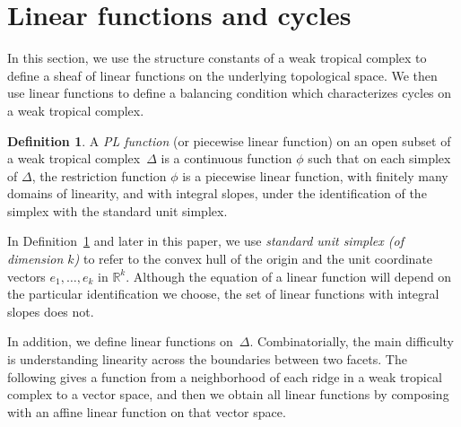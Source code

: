 \documentclass[11pt,reqno]{amsart}
\theoremstyle{definition}
\newtheorem{defn}[thm]{Definition}
\newcommand{\defi}[1]{\emph{#1}}
\newcommand{\RR}{\mathbb R}
\begin{document}
\section{Linear functions and cycles}\label{s:linear}

In this section, we use the structure constants of a weak tropical complex to
define a sheaf of linear functions on the underlying topological space. We then
use linear functions to define a balancing condition which characterizes
cycles on a weak tropical complex.

\begin{defn}\label{d:pl-function}
A \defi{PL function} (or piecewise linear function) on an open subset of a weak
tropical complex~$\Delta$ is a continuous function $\phi$ such that on each
simplex of $\Delta$, the restriction function $\phi$ is a piecewise linear
function, with finitely many domains of linearity, and with integral slopes,
under the
identification of the simplex with the standard unit simplex.
\end{defn}

In Definition~\ref{d:pl-function} and later in this paper, we use \defi{standard
unit simplex (of dimension $k$)} to refer to the convex hull of the origin and
the unit coordinate vectors $e_1, \ldots, e_{k}$ in $\RR^{k}$. Although the
equation of a linear function will depend on the particular identification we
choose, the set of linear functions with integral slopes does not.

In addition, we define linear functions on~$\Delta$.
Combinatorially, the main difficulty is
understanding linearity across the boundaries between two facets. The following
gives a function from a neighborhood of each ridge in a weak tropical complex to
a vector space, and then we obtain all linear functions by composing with an
affine linear function on that vector space.
\end{document}
